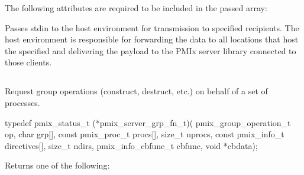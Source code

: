 \reqattrstart
The following attributes are required to be included in the passed  array:


\reqattrend

\descr

Passes stdin to the host environment for transmission to specified recipients. The host environment is responsible for forwarding the data to all locations that host the specified  and delivering the payload to the \ac{PMIx} server library connected to those clients.

\subsection{}

\summary

Request group operations (construct, destruct, etc.) on behalf of a set of processes.

\format

\cspecificstart
\begin{codepar}
typedef pmix_status_t (*pmix_server_grp_fn_t)(
                           pmix_group_operation_t op, char grp[],
                           const pmix_proc_t procs[], size_t nprocs,
                           const pmix_info_t directives[],
                           size_t ndirs,
                           pmix_info_cbfunc_t cbfunc, void *cbdata);
\end{codepar}
\cspecificend

\begin{arglist}
\end{arglist}

Returns one of the following:

